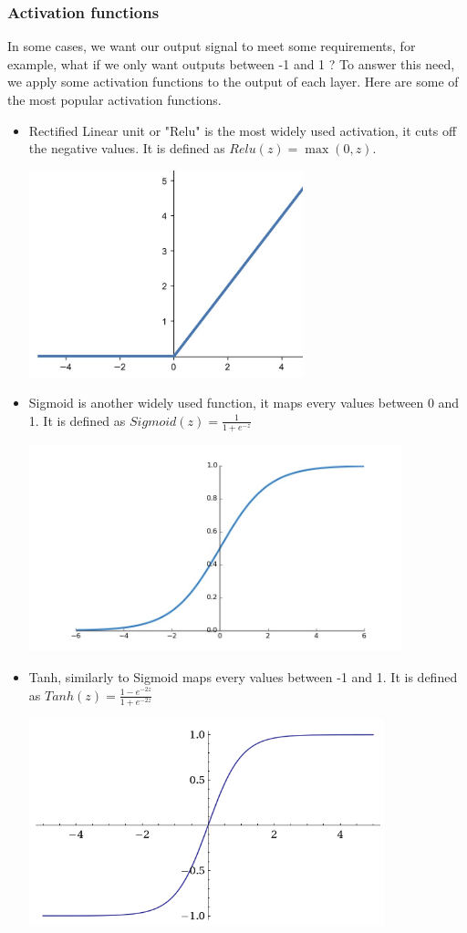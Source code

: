 \documentclass[12pt]{article}
\begin{document}
\subsubsection{Activation functions}
In some cases, we want our output signal to meet some requirements, for example, what if we only want outputs between -1 and 1 ? To answer this need, we apply some activation functions to the output of each layer. Here are some of the most popular activation functions. \\
\begin{itemize}

\item Rectified Linear unit or "Relu" is the most widely used activation, it cuts off the negative values. It is defined as $ Relu(z) = \max(0, z)$. \\
\centerline{\includegraphics[height=6cm]{../../docs/relu.png}}

\item Sigmoid is another widely used function, it maps every values between 0 and 1. It is defined as $ Sigmoid(z) = \frac{1} {1 + e^{-z}}$ \\
\centerline{\includegraphics[height=6cm]{../../docs/sigmoid.png}}

\item Tanh, similarly to Sigmoid maps every values between -1 and 1. It is defined as $ Tanh(z) = \frac{1 - e^{-2z}}{1 + e^{-2z}}$ \\
\centerline{\includegraphics[height=6cm]{../../docs/tanh.png}}


\end{itemize}
\end{document}
